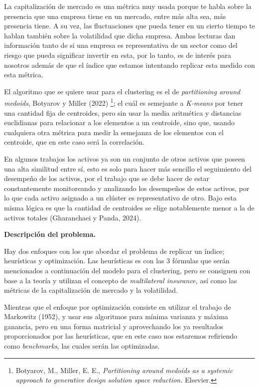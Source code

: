 \documentclass[
]{article}
\begin{document}
La capitalización de mercado es una métrica muy usada porque te habla
sobre la presencia que una empresa tiene en un mercado, entre más alta
sea, más presencia tiene. A su vez, las fluctuaciones que pueda tener en
un cierto tiempo te hablan también sobre la volatilidad que dicha
empresa. Ambas lecturas dan información tanto de si una empresa es
representativa de un sector como del riesgo que pueda significar
invertir en esta, por lo tanto, es de interés para nosotros además de
que el índice que estamos intentando replicar esta medido con esta
métrica.

El algoritmo que se quiere usar para el clustering es el de
\emph{partitioning around medoids}, Botyarov y Miller (2022)
\footnote{Botyarov, M., Miller, E. E., 
\emph{Partitioning around medoids as a systemic approach to generative design solution space reduction.}
Elsevier.}; el cuál es semejante a \emph{K-means} por tener una 
cantidad fija de centroides, pero sin usar la media aritmética y 
distancias euclidianas para relacionar a los elementos a un 
centroide, sino que, usando cualquiera otra métrica para medir la 
semejanza de los elementos con el centroide, que en este caso será la correlación.

En algunos trabajos los activos ya son un conjunto de otros activos que
poseen una alta similitud entre sí, esto es solo para hacer más sencillo
el seguimiento del desempeño de los activos, por el trabajo que se debe
hacer de estar constantemente monitoreando y analizando los desempeños
de estos activos, por lo que cada activo asignado a un clúster es
representativo de otro. Bajo esta misma lógica es que la cantidad de
centroides se elige notablemente menor a la de activos totales
(Gharanchaei y Panda, 2024).

\textbf{Descripción del problema.}

Hay dos enfoques con los que abordar el problema de replicar un índice;
heurísticas y optimización. Las heurísticas es con las 3 fórmulas que
serán mencionados a continuación del modelo para el clustering, pero se
consiguen con base a la teoría y utilizan el concepto de
\emph{multilateral insurance,} así como las métricas de la
capitalización de mercado y la volatilidad.

Mientras que el enfoque por optimización consiste en utilizar el trabajo
de Markowitz (1952), y usar sus algoritmos para mínima varianza y
máxima ganancia, pero en una forma matricial y aprovechando los ya
resultados proporcionados por las heurísticas, que en este caso nos
estaremos refiriendo como \emph{benchmarks}, las cuales serán las
optimizadas.
\end{document}
